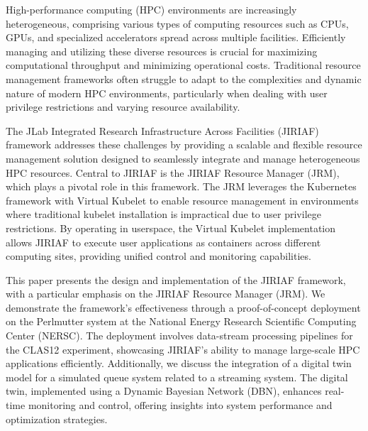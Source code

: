 High-performance computing (HPC) environments are increasingly heterogeneous, comprising various types of computing resources such as CPUs, GPUs, and specialized accelerators spread across multiple facilities. Efficiently managing and utilizing these diverse resources is crucial for maximizing computational throughput and minimizing operational costs. Traditional resource management frameworks often struggle to adapt to the complexities and dynamic nature of modern HPC environments, particularly when dealing with user privilege restrictions and varying resource availability.

The JLab Integrated Research Infrastructure Across Facilities (JIRIAF) framework addresses these challenges by providing a scalable and flexible resource management solution designed to seamlessly integrate and manage heterogeneous HPC resources. Central to JIRIAF is the JIRIAF Resource Manager (JRM), which plays a pivotal role in this framework. The JRM leverages the Kubernetes framework with Virtual Kubelet to enable resource management in environments where traditional kubelet installation is impractical due to user privilege restrictions. By operating in userspace, the Virtual Kubelet implementation allows JIRIAF to execute user applications as containers across different computing sites, providing unified control and monitoring capabilities.

This paper presents the design and implementation of the JIRIAF framework, with a particular emphasis on the JIRIAF Resource Manager (JRM). We demonstrate the framework's effectiveness through a proof-of-concept deployment on the Perlmutter system at the National Energy Research Scientific Computing Center (NERSC). The deployment involves data-stream processing pipelines for the CLAS12 experiment, showcasing JIRIAF's ability to manage large-scale HPC applications efficiently. Additionally, we discuss the integration of a digital twin model for a simulated queue system related to a streaming system. The digital twin, implemented using a Dynamic Bayesian Network (DBN), enhances real-time monitoring and control, offering insights into system performance and optimization strategies.
